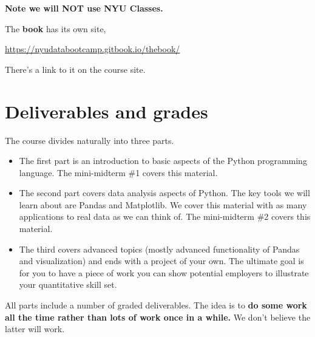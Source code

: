 \textbf{Note we will NOT use NYU Classes.}

The {\bf book\/} has its own site,
\vspace{-0.15in}
\begin{center}
\url{https://nyudatabootcamp.gitbook.io/thebook/}
\end{center}
\vspace{-0.15in}
%
There's a link to it on the course site.

\section*{Deliverables and grades}

The course divides naturally into three parts.
\begin{itemize}
\item The first part is an introduction to basic aspects of the Python programming language. The mini-midterm \#1 covers this material.
\item The second part covers data analysis aspects of Python. The key tools we will learn about are Pandas and Matplotlib. We cover this material with as many applications to real data as we can think of. The mini-midterm \#2 covers this material.
\item The third covers advanced topics (mostly advanced functionality of Pandas and visualization) and ends with a project of your own. The ultimate goal is for you to have a piece of work you can show potential employers to illustrate your quantitative skill set.
\end{itemize}
All parts include a number of graded deliverables. The idea is to {\bf do some work all the time rather than lots of work once in a while.} We don't believe the latter will work.


